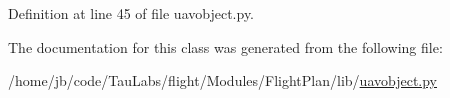 \-Definition at line 45 of file uavobject.\-py.



\-The documentation for this class was generated from the following file\-:\begin{DoxyCompactItemize}
\item 
/home/jb/code/\-Tau\-Labs/flight/\-Modules/\-Flight\-Plan/lib/\hyperlink{uavobject_8py}{uavobject.\-py}\end{DoxyCompactItemize}
